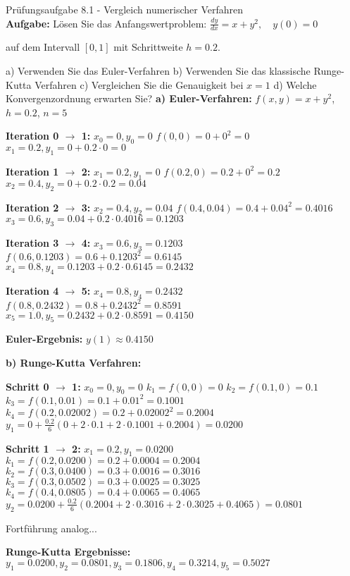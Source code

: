 \begin{example2}{Prüfungsaufgabe 8.1 - Vergleich numerischer Verfahren}\\
\textbf{Aufgabe:} Lösen Sie das Anfangswertproblem:
$\frac{dy}{dx} = x + y^2, \quad y(0) = 0$

auf dem Intervall $[0, 1]$ mit Schrittweite $h = 0.2$.

a) Verwenden Sie das Euler-Verfahren
b) Verwenden Sie das klassische Runge-Kutta Verfahren  
c) Vergleichen Sie die Genauigkeit bei $x = 1$
d) Welche Konvergenzordnung erwarten Sie?
\tcblower
\textbf{a) Euler-Verfahren:}
$f(x,y) = x + y^2$, $h = 0.2$, $n = 5$

\textbf{Iteration 0 $\rightarrow$ 1:}
$x_0 = 0, y_0 = 0$
$f(0, 0) = 0 + 0^2 = 0$
$x_1 = 0.2, y_1 = 0 + 0.2 \cdot 0 = 0$

\textbf{Iteration 1 $\rightarrow$ 2:}
$x_1 = 0.2, y_1 = 0$
$f(0.2, 0) = 0.2 + 0^2 = 0.2$
$x_2 = 0.4, y_2 = 0 + 0.2 \cdot 0.2 = 0.04$

\textbf{Iteration 2 $\rightarrow$ 3:}
$x_2 = 0.4, y_2 = 0.04$
$f(0.4, 0.04) = 0.4 + 0.04^2 = 0.4016$
$x_3 = 0.6, y_3 = 0.04 + 0.2 \cdot 0.4016 = 0.1203$

\textbf{Iteration 3 $\rightarrow$ 4:}
$x_3 = 0.6, y_3 = 0.1203$
$f(0.6, 0.1203) = 0.6 + 0.1203^2 = 0.6145$
$x_4 = 0.8, y_4 = 0.1203 + 0.2 \cdot 0.6145 = 0.2432$

\textbf{Iteration 4 $\rightarrow$ 5:}
$x_4 = 0.8, y_4 = 0.2432$
$f(0.8, 0.2432) = 0.8 + 0.2432^2 = 0.8591$
$x_5 = 1.0, y_5 = 0.2432 + 0.2 \cdot 0.8591 = 0.4150$

\textbf{Euler-Ergebnis:} $y(1) \approx 0.4150$

\textbf{b) Runge-Kutta Verfahren:}

\textbf{Schritt 0 $\rightarrow$ 1:} $x_0 = 0, y_0 = 0$
$k_1 = f(0, 0) = 0$
$k_2 = f(0.1, 0) = 0.1$
$k_3 = f(0.1, 0.01) = 0.1 + 0.01^2 = 0.1001$
$k_4 = f(0.2, 0.02002) = 0.2 + 0.02002^2 = 0.2004$
$y_1 = 0 + \frac{0.2}{6}(0 + 2 \cdot 0.1 + 2 \cdot 0.1001 + 0.2004) = 0.0200$

\textbf{Schritt 1 $\rightarrow$ 2:} $x_1 = 0.2, y_1 = 0.0200$
$k_1 = f(0.2, 0.0200) = 0.2 + 0.0004 = 0.2004$
$k_2 = f(0.3, 0.0400) = 0.3 + 0.0016 = 0.3016$
$k_3 = f(0.3, 0.0502) = 0.3 + 0.0025 = 0.3025$
$k_4 = f(0.4, 0.0805) = 0.4 + 0.0065 = 0.4065$
$y_2 = 0.0200 + \frac{0.2}{6}(0.2004 + 2 \cdot 0.3016 + 2 \cdot 0.3025 + 0.4065) = 0.0801$

Fortführung analog...

\textbf{Runge-Kutta Ergebnisse:}
$y_1 = 0.0200, y_2 = 0.0801, y_3 = 0.1806, y_4 = 0.3214, y_5 = 0.5027$


\end{example2}
